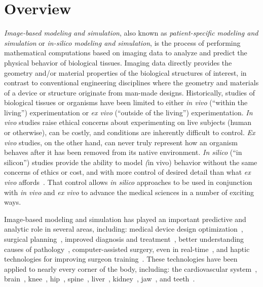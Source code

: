 \chapter{Overview}
%

\textit{Image-based modeling and simulation}, also known as \textit{patient-specific modeling and simulation} or \textit{in-silico modeling and simulation}, is the process of performing mathematical computations based on imaging data to analyze and predict the physical behavior of biological tissues. Imaging data directly provides the geometry and/or material properties of the biological structures of interest, in contrast to conventional engineering disciplines where the geometry and materials of a device or structure originate from man-made designs. Historically, studies of biological tissues or organisms have been limited to either \textit{in vivo} (``within the living'') experimentation or \textit{ex vivo} (``outside of the living'') experimentation. \textit{In vivo} studies raise ethical concerns about experimenting on live subjects (human or otherwise), can be costly, and conditions are inherently difficult to control. \textit{Ex vivo} studies, on the other hand, can never truly represent how an organism behaves after it has been removed from its native environment. \textit{In silico} (``in silicon'') studies provide the ability to model \textit(in vivo) behavior without the same concerns of ethics or cost, and with more control of desired detail than what \textit{ex vivo} affords~\cite{colquitt_2011}. That control allows \textit{in silico} approaches to be used in conjunction with \textit{in vivo} and \textit{ex vivo} to advance the medical sciences in a number of exciting ways.


Image-based modeling and simulation has played an important predictive and analytic role in several areas, including:  medical device design optimization~\cite{},  surgical planning~\cite{}, improved diagnosis and treatment~\cite{}, better understanding causes of pathology~\cite{}, computer-assisted surgery, even in real-time~\cite{strbac_2015}, and haptic technologies for improving surgeon training~\cite{chen, pan_2015}. These technologies have been applied to nearly every corner of the body, including: the cardiovascular system~\cite{min_2015, updegrove_2016}, brain~\cite{weickenmeier_2016, behnia_2008}, knee~\cite{erdemir_2015, donahue_2002}, hip~\cite{anderson_2008, }, spine~\cite{}, liver~\cite{}, kidney~\cite{eloot_2002}, jaw~\cite{}, and teeth~\cite{}.

